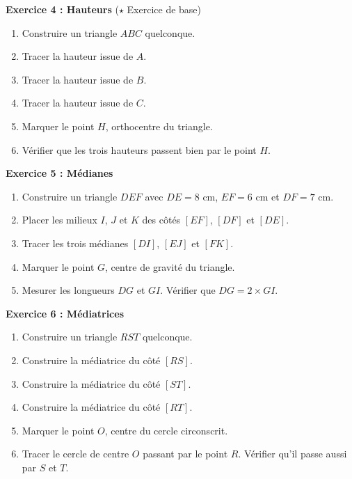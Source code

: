 \begin{exercisebox}
	\textbf{Exercice 4 : Hauteurs} ($\star$ Exercice de base)

	\begin{enumerate}[label=\alph*)]
		\item Construire un triangle $ABC$ quelconque.
		\item Tracer la hauteur issue de $A$.
		\item Tracer la hauteur issue de $B$.
		\item Tracer la hauteur issue de $C$.
		\item Marquer le point $H$, orthocentre du triangle.
		\item Vérifier que les trois hauteurs passent bien par le point $H$.
	\end{enumerate}

	\medskip

	\textbf{Exercice 5 : Médianes}

	\begin{enumerate}[label=\alph*)]
		\item Construire un triangle $DEF$ avec $DE = 8$ cm, $EF = 6$ cm et $DF = 7$ cm.
		\item Placer les milieux $I$, $J$ et $K$ des côtés $[EF]$, $[DF]$ et $[DE]$.
		\item Tracer les trois médianes $[DI]$, $[EJ]$ et $[FK]$.
		\item Marquer le point $G$, centre de gravité du triangle.
		\item Mesurer les longueurs $DG$ et $GI$. Vérifier que $DG = 2 \times GI$.
	\end{enumerate}

	\medskip

	\textbf{Exercice 6 : Médiatrices}

	\begin{enumerate}[label=\alph*)]
		\item Construire un triangle $RST$ quelconque.
		\item Construire la médiatrice du côté $[RS]$.
		\item Construire la médiatrice du côté $[ST]$.
		\item Construire la médiatrice du côté $[RT]$.
		\item Marquer le point $O$, centre du cercle circonscrit.
		\item Tracer le cercle de centre $O$ passant par le point $R$. Vérifier qu'il passe aussi par $S$ et $T$.
	\end{enumerate}
\end{exercisebox}

